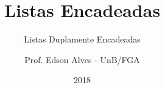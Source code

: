 \title{Listas Encadeadas}
\subtitle{Listas Duplamente Encadeadas}
\author{Prof. Edson Alves - UnB/FGA}
\date{2018}
